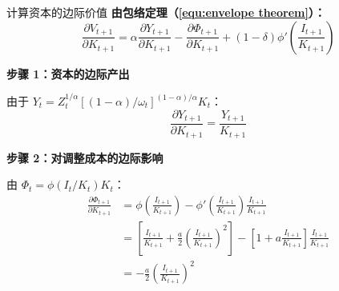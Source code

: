 \documentclass{beamer}
\begin{document}
\begin{frame}{计算资本的边际价值}
    \textbf{由包络定理（\ref{equ:envelope theorem}）：}
    \begin{equation*}
        \frac{\partial V_{t+1}}{\partial K_{t+1}} = \alpha \frac{\partial Y_{t+1}}{\partial K_{t+1}} - \frac{\partial \Phi_{t+1}}{\partial K_{t+1}} + (1-\delta) \phi'\left(\frac{I_{t+1}}{K_{t+1}}\right)
    \end{equation*}

    \textbf{步骤 1：资本的边际产出}

    由于 $Y_t = Z_t^{1/\alpha} [(1-\alpha)/\omega_t]^{(1-\alpha)/\alpha} K_t$：
    \begin{equation*}
        \frac{\partial Y_{t+1}}{\partial K_{t+1}} = \frac{Y_{t+1}}{K_{t+1}}
    \end{equation*}

    \textbf{步骤 2：对调整成本的边际影响}

    由 $\Phi_t = \phi(I_t/K_t) K_t$：
    \begin{equation*}
        \begin{aligned}
            \frac{\partial \Phi_{t+1}}{\partial K_{t+1}} &= \phi\left(\frac{I_{t+1}}{K_{t+1}}\right) - \phi'\left(\frac{I_{t+1}}{K_{t+1}}\right) \frac{I_{t+1}}{K_{t+1}} \\
            &= \left[\frac{I_{t+1}}{K_{t+1}} + \frac{a}{2}\left(\frac{I_{t+1}}{K_{t+1}}\right)^2\right] - \left[1 + a\frac{I_{t+1}}{K_{t+1}}\right] \frac{I_{t+1}}{K_{t+1}} \\
            &= -\frac{a}{2}\left(\frac{I_{t+1}}{K_{t+1}}\right)^2
        \end{aligned}
    \end{equation*}
\end{frame}
\end{document}
